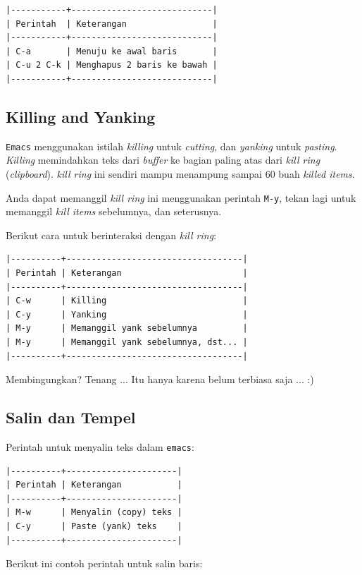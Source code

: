 \documentclass{article}
\begin{document}
\begin{verbatim}
|-----------+----------------------------|
| Perintah  | Keterangan                 |
|-----------+----------------------------|
| C-a       | Menuju ke awal baris       |
| C-u 2 C-k | Menghapus 2 baris ke bawah |
|-----------+----------------------------|
\end{verbatim}

\subsection{Killing and Yanking}
\verb=Emacs= menggunakan istilah \emph{killing} untuk \emph{cutting}, dan
\emph{yanking} untuk \emph{pasting}. \emph{Killing} memindahkan teks dari
\emph{buffer} ke bagian paling atas dari \emph{kill ring} (\emph{clipboard}).
\emph{kill ring} ini sendiri mampu menampung sampai 60 buah \emph{killed items}.

Anda dapat memanggil \emph{kill ring} ini menggunakan perintah \verb=M-y=, 
tekan lagi untuk memanggil \emph{kill items} sebelumnya, dan seterusnya.

Berikut cara untuk berinteraksi dengan \emph{kill ring}:

\begin{verbatim}
|----------+-----------------------------------|
| Perintah | Keterangan                        |
|----------+-----------------------------------|
| C-w      | Killing                           |
| C-y      | Yanking                           |
| M-y      | Memanggil yank sebelumnya         |
| M-y      | Memanggil yank sebelumnya, dst... |
|----------+-----------------------------------|
\end{verbatim}

Membingungkan? Tenang ... Itu hanya karena belum terbiasa saja ... :)

\subsection{Salin dan Tempel}

Perintah untuk menyalin teks dalam \verb=emacs=:

\begin{verbatim}
|----------+----------------------|
| Perintah | Keterangan           |
|----------+----------------------|
| M-w      | Menyalin (copy) teks |
| C-y      | Paste (yank) teks    |
|----------+----------------------|
\end{verbatim}

Berikut ini contoh perintah untuk salin baris:
\end{document}
